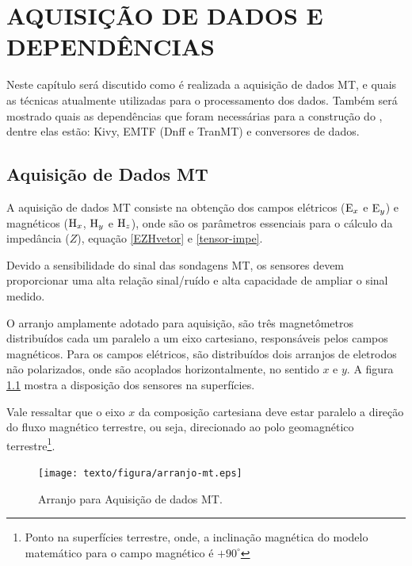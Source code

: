 \chapter{AQUISIÇÃO DE DADOS E DEPENDÊNCIAS}
    
    Neste capítulo será discutido como é realizada a aquisição de dados MT, e quais as técnicas atualmente utilizadas para o processamento dos dados. Também será mostrado quais as dependências que foram necessárias para a construção do \software, dentre elas estão: Kivy, EMTF (Dnff e TranMT) e conversores de dados.
        
    \section{Aquisição de Dados MT}        
    
        A aquisição de dados MT consiste na obtenção dos campos elétricos ($\textrm{E}_x$ e $\textrm{E}_y$) e magnéticos ($\textrm{H}_x$, $\textrm{H}_y$ e $\textrm{H}_z$), onde são os parâmetros essenciais para o cálculo da impedância ($Z$), equação \ref{EZHvetor} e \ref{tensor-impe}.
        
        Devido a sensibilidade do sinal das sondagens MT, os sensores devem proporcionar uma alta relação sinal/ruído e alta capacidade de ampliar o sinal medido.
        
        O arranjo amplamente adotado para aquisição, são três magnetômetros distribuídos cada um paralelo a um eixo cartesiano, responsáveis pelos campos magnéticos. Para os campos elétricos, são distribuídos dois arranjos de eletrodos não polarizados, onde são acoplados horizontalmente, no sentido $x$ e $y$. A figura \ref{fig-arranjo-mt} mostra a disposição dos sensores na superfícies.
        
        Vale ressaltar que o eixo $x$ da composição cartesiana deve estar paralelo a direção do fluxo magnético terrestre, ou seja, direcionado ao polo geomagnético terrestre\footnote{Ponto na superfícies terrestre, onde, a inclinação magnética do modelo matemático para o campo magnético é $+90^\circ$}. 
        
        \begin{figure}[H]
            \caption{Arranjo para Aquisição de dados MT.}
                \begin{center}
                    \texttt{[image: texto/figura/arranjo-mt.eps]}
                \end{center}
            \label{fig-arranjo-mt}
        \end{figure}
        
